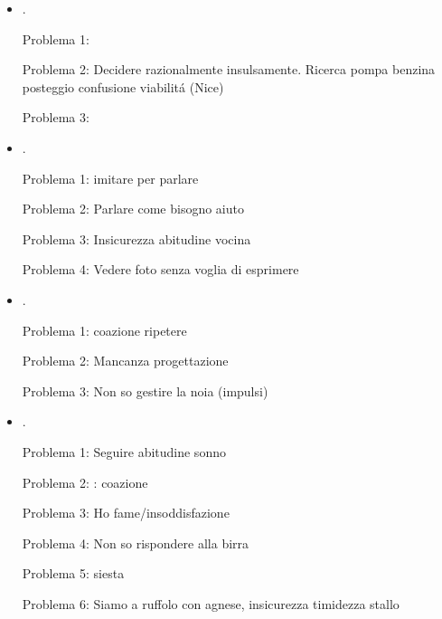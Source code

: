 \begin{itemize}
Problema 3: Faccio la doccia sulla spiaggia - essere angoscia conseguenze

Problema 4: intimidito dalla tua esuberanza

Problema 6: vago in attesa che abbia voglia di un glace

Problema 7: 

Problema 8: Ho sonno non conosco la strada - perch\'e vado normalmente?

Problema 9: : devo arrivare all'autogrill

\item {}.

Problema 1: 

Problema 2: Decidere razionalmente insulsamente. Ricerca pompa benzina posteggio confusione viabilit\'a (Nice)

Problema 3: 

\item {}.

Problema 1: imitare per parlare

Problema 2: Parlare come bisogno aiuto

Problema 3: Insicurezza abitudine vocina

Problema 4: Vedere foto senza voglia di esprimere

\item {}.

Problema 1: coazione ripetere 

Problema 2: Mancanza progettazione

Problema 3: Non so gestire la noia (impulsi)

\item {}.

Problema 1: Seguire abitudine sonno

Problema 2: : coazione

Problema 3: Ho fame/insoddisfazione

Problema 4: Non so rispondere alla birra

Problema 5: siesta

Problema 6: Siamo a ruffolo con agnese, insicurezza timidezza stallo


\end{itemize}
